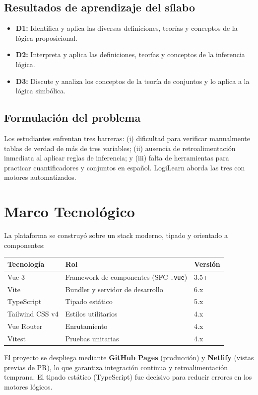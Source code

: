 \documentclass[12pt,a4paper]{article}
\begin{document}
\subsection{Resultados de aprendizaje del sílabo}
\begin{itemize}
  \item \textbf{D1:} Identifica y aplica las diversas definiciones, teorías y conceptos de la lógica proposicional.
  \item \textbf{D2:} Interpreta y aplica las definiciones, teorías y conceptos de la inferencia lógica.
  \item \textbf{D3:} Discute y analiza los conceptos de la teoría de conjuntos y lo aplica a la lógica simbólica.
\end{itemize}

\subsection{Formulación del problema}
Los estudiantes enfrentan tres barreras: (i) dificultad para verificar manualmente tablas de verdad
de más de tres variables; (ii) ausencia de retroalimentación inmediata al aplicar reglas de
inferencia; y (iii) falta de herramientas para practicar cuantificadores y conjuntos en español.
LogiLearn aborda las tres con motores automatizados.

\section{Marco Tecnológico}
La plataforma se construyó sobre un stack moderno, tipado y orientado a componentes:

\begin{center}
\begin{tabular}{lll}
\toprule
Tecnología & Rol & Versión \\
\midrule
Vue 3 & Framework de componentes (SFC \texttt{.vue}) & 3.5+ \\
Vite & Bundler y servidor de desarrollo & 6.x \\
TypeScript & Tipado estático & 5.x \\
Tailwind CSS v4 & Estilos utilitarios & 4.x \\
Vue Router & Enrutamiento & 4.x \\
Vitest & Pruebas unitarias & 4.x \\
\bottomrule
\end{tabular}
\end{center}

El proyecto se despliega mediante \textbf{GitHub Pages} (producción) y \textbf{Netlify} (vistas
previas de PR), lo que garantiza integración continua y retroalimentación temprana. El tipado
estático (TypeScript) fue decisivo para reducir errores en los motores lógicos.
\end{document}
